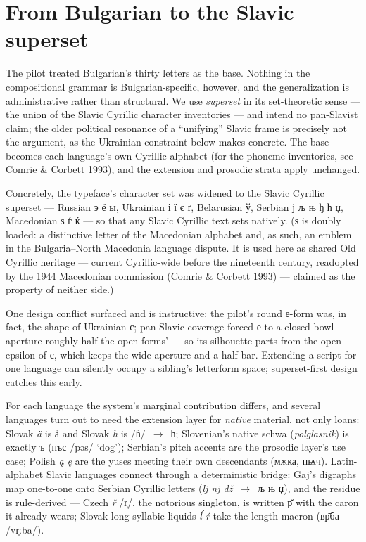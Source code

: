 \documentclass[11pt]{article}
\newcommand{\cz}[1]{{\chu #1}}
\newcommand{\ph}[1]{{\ipafont/#1/}}
\begin{document}
\section{From Bulgarian to the Slavic superset}
\label{sec:panslavic}

The pilot treated Bulgarian's thirty letters as the base. Nothing in the compositional grammar is Bulgarian-specific, however, and the generalization is administrative rather than structural. We use \emph{superset} in its set-theoretic sense — the union of the Slavic Cyrillic character inventories — and intend no pan-Slavist claim; the older political resonance of a ``unifying'' Slavic frame is precisely not the argument, as the Ukrainian constraint below makes concrete. The base becomes each language's own Cyrillic alphabet (for the phoneme inventories, see Comrie \& Corbett 1993), and the extension and prosodic strata apply unchanged.

Concretely, the typeface's character set was widened to the Slavic Cyrillic superset — Russian \cz{э ё ы}, Ukrainian \cz{і ї є ґ}, Belarusian \cz{ў}, Serbian \cz{ј љ њ ђ ћ џ}, Macedonian \cz{ѕ ѓ ќ} — so that any Slavic Cyrillic text sets natively. (\cz{ѕ} is doubly loaded: a distinctive letter of the Macedonian alphabet and, as such, an emblem in the Bulgaria–North Macedonia language dispute. It is used here as shared Old Cyrillic heritage — current Cyrillic-wide before the nineteenth century, readopted by the 1944 Macedonian commission (Comrie \& Corbett 1993) — claimed as the property of neither side.)

One design conflict surfaced and is instructive: the pilot's round е-form was, in fact, the shape of Ukrainian \cz{є}; pan-Slavic coverage forced \cz{е} to a closed bowl — aperture roughly half the open forms' — so its silhouette parts from the open epsilon of \cz{є}, which keeps the wide aperture and a half-bar. Extending a script for one language can silently occupy a sibling's letterform space; superset-first design catches this early.

For each language the system's marginal contribution differs, and several languages turn out to need the extension layer for \emph{native} material, not only loans: Slovak \emph{ä} is \cz{ӓ} and Slovak \emph{h} is \ph{ɦ}~$\rightarrow$~\cz{һ}; Slovenian's native schwa (\emph{polglasnik}) is exactly \cz{ъ} (\cz{пъс} \ph{pəs} `dog'); Serbian's pitch accents are the prosodic layer's use case; Polish \emph{ą ę} are the yuses meeting their own descendants (\cz{мѫка}, \cz{пѩч}). Latin-alphabet Slavic languages connect through a deterministic bridge: Gaj's digraphs map one-to-one onto Serbian Cyrillic letters (\emph{lj nj dž}~$\rightarrow$~\cz{љ њ џ}), and the residue is rule-derived — Czech \emph{ř} \ph{r̝}, the notorious singleton, is written \cz{р̌} with the caron it already wears; Slovak long syllabic liquids \emph{ĺ ŕ} take the length macron (\cz{вр̄ба} \ph{vr̩ːba}).
\end{document}
